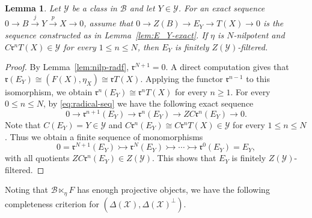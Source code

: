 \documentclass[11pt,reqno]{amsart}
\numberwithin{equation}{section}
\newtheorem{lemma}[theorem]{Lemma}
\newcommand{\cB}{\mathcal B}
\newcommand{\cX}{\mathcal X}
\newcommand{\cY}{\mathcal Y}
\newcommand{\radf}{\mathfrak r}
\begin{document}
\begin{lemma}\label{lem:nilp-Z(Y)}
Let $\cY$ be a class in $\cB$ and let $Y\in \cY$. For an exact sequence $0\rightarrow B\xrightarrow{j} Y \xrightarrow{p} X\rightarrow 0$, assume that $0\rightarrow Z(B)\rightarrow E_Y\rightarrow T(X)\rightarrow 0$ is the sequence constructed as in Lemma~\ref{lem:E_Y-exact}. If $\eta$ is $N$-nilpotent and $C\radf^nT(X)\in \cY$ for
every $1\leq n\leq N$, then $E_Y$ is finitely $Z(\cY)$-filtered.
\end{lemma}
\begin{proof}
By Lemma~\ref{lem:nilp-radf}, $\radf^{N+1}=0$. A direct computation gives that
$\radf(E_Y)\cong (F(X),\eta_X)\cong \radf T(X)$. Applying the functor $\radf^{n-1}$ to this isomorphism, we obtain $\radf^n(E_Y)\cong \radf^n T(X)$ for every $n\geq 1$.
For every $0\leq n\leq N$, by \eqref{eq:radical-seq} we have the following exact sequence
\[
0\to \radf^{n+1}(E_Y)\to \radf^n(E_Y) \to ZC\radf^n(E_Y)\to 0.
\]
Note that $C(E_Y)=Y\in \cY$ and $C\radf^n(E_Y)\cong C\radf^nT(X)\in \cY$ for
every $1\leq n\leq N$. Thus we obtain a finite sequence of monomorphisms
\[
0=\radf^{N+1}(E_Y)\rightarrowtail \radf^N(E_Y)\rightarrowtail \cdots \rightarrowtail \radf^0(E_Y)=E_Y,
\]
with all quotients $ZC\radf^n(E_Y)\in Z(\cY)$. This shows that $E_Y$ is finitely $Z(\cY)$-filtered.
\end{proof}



Noting that $\cB\ltimes_\eta F$ has enough projective objects, we have the following completeness criterion for $(\Delta(\cX),\Delta(\cX)^\perp)$.
\end{document}
